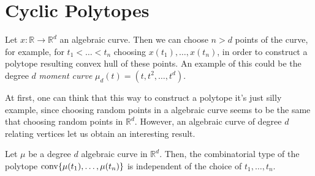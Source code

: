 \chapter{Cyclic Polytopes}
\label{lecture4}

\newcommand{\R}{\mathbb{R}}

Let $x\colon \R \rightarrow \R^d$ an algebraic curve. Then we can choose $n>d$ points of the curve, for example, for $t_1<\dots<t_n$ choosing $x(t_1),\dots,x(t_n)$, in order to construct a polytope resulting convex hull of these points. An example of this could be the degree $d$ \emph{moment curve} $\mu_d(t) = (t,t^2,\dots,t^d)$.

At first, one can think that this way to construct a polytope it's just silly example, since choosing random points in a algebraic curve seems to be the same that choosing random points in $\R^d$. However, an algebraic curve of degree $d$ relating vertices let us obtain an interesting result.

\begin{theorem}
  Let $\mu$ be a degree $d$ algebraic curve in $\R^d$. Then, the combinatorial type of the polytope $\operatorname{conv}\{\mu(t_1),\dots,\mu(t_n)\}$ is independent of the choice of $t_1,\dots,t_n$.
\end{theorem}
